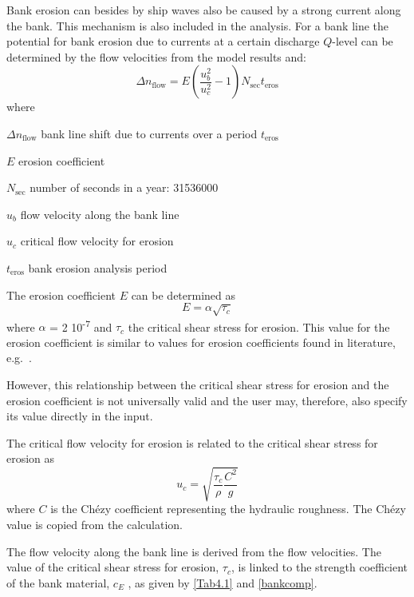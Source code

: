Bank erosion can besides by ship waves also be caused by a strong current along the bank.
This mechanism is also included in the \dfastbe analysis.
For a bank line the potential for bank erosion due to currents at a certain discharge $Q$-level can be determined by the flow velocities from the model results and:
%
\begin{equation}
\Delta n_\text{flow} = E \left ( \frac{u_b^2}{u_c^2} - 1 \right ) N_\text{sec} t_\text{eros}
\end{equation}
%
where
%
\begin{symbollist}
\item[$\Delta n_\text{flow}$] bank line shift due to currents over a period $t_\text{eros}$ 
\item[$E$] erosion coefficient 
\item[$N_\text{sec}$] number of seconds in a year: 31536000 \unitbrackets{-}
\item[$u_b$] flow velocity along the bank line 
\item[$u_c$] critical flow velocity for erosion 
\item[$t_\text{eros}$] bank erosion analysis period 
\end{symbollist}
%
The erosion coefficient $E$ can be determined as
%
\begin{equation}
E = \alpha \sqrt{\tau_c}
\end{equation}
%
where $\alpha$ = 2 10\textsuperscript{-7}  and $\tau_c$  the critical shear stress for erosion.
This value for the erosion coefficient is similar to values for erosion coefficients found in literature, e.g.~\citet{Crosato07}.

However, this relationship between the critical shear stress for erosion and the erosion coefficient is not universally valid and the user may, therefore, also specify its value directly in the input.

The critical flow velocity for erosion is related to the critical shear stress for erosion as
%
\begin{equation}
u_c = \sqrt{\frac{\tau_c}{\rho} \frac{C^2}{g}}
\end{equation}
%
where $C$  is the Ch\'ezy coefficient representing the hydraulic roughness.
The Ch\'ezy value is copied from the \dflowfm calculation.

The flow velocity along the bank line is derived from the \dflowfm flow velocities.
The value of the critical shear stress for erosion, $\tau_c$, is linked to the strength coefficient of the bank material, $c_E$ , as given by \autoref{Tab4.1} and \autoref{bankcomp}.


